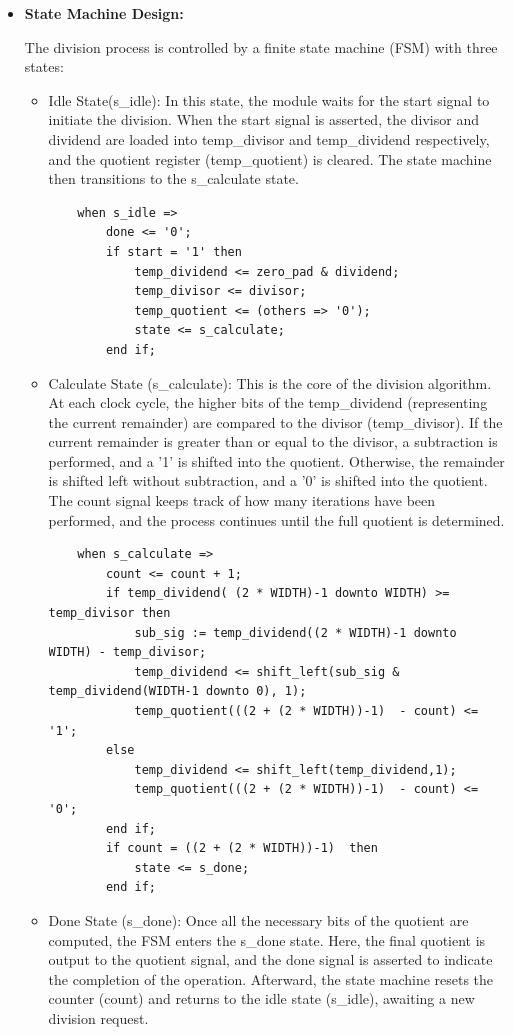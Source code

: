 \begin{itemize}
\item[$\rightarrow$]\textbf{State Machine Design:}

The division process is controlled by a finite state machine (FSM) with three states:

\begin{itemize}
	\item [$\bullet$] Idle State(s\_idle): In this state, the module waits for the start signal to initiate the division. When the start signal is asserted, the divisor and dividend are loaded into temp\_divisor and temp\_dividend respectively, and the quotient register (temp\_quotient) is cleared. The state machine then transitions to the s\_calculate state.
	
	\begin{lstlisting}
	when s_idle => 
		done <= '0';
		if start = '1' then
			temp_dividend <= zero_pad & dividend;
			temp_divisor <= divisor;
			temp_quotient <= (others => '0');
			state <= s_calculate;
		end if;
	\end{lstlisting}

	\item [$\bullet$] Calculate State (s\_calculate): This is the core of the division algorithm. At each clock cycle, the higher bits of the temp\_dividend (representing the current remainder) are compared to the divisor (temp\_divisor). If the current remainder is greater than or equal to the divisor, a subtraction is performed, and a '1' is shifted into the quotient. Otherwise, the remainder is shifted left without subtraction, and a '0' is shifted into the quotient. The count signal keeps track of how many iterations have been performed, and the process continues until the full quotient is determined.
	
	\begin{lstlisting}
	when s_calculate =>
		count <= count + 1;
		if temp_dividend( (2 * WIDTH)-1 downto WIDTH) >= temp_divisor then
			sub_sig := temp_dividend((2 * WIDTH)-1 downto WIDTH) - temp_divisor;
			temp_dividend <= shift_left(sub_sig & temp_dividend(WIDTH-1 downto 0), 1);
			temp_quotient(((2 + (2 * WIDTH))-1)  - count) <= '1';        
		else
			temp_dividend <= shift_left(temp_dividend,1);
			temp_quotient(((2 + (2 * WIDTH))-1)  - count) <= '0';
		end if;
		if count = ((2 + (2 * WIDTH))-1)  then
			state <= s_done;
		end if;
	\end{lstlisting}

	\item [$\bullet$] Done State (s\_done): Once all the necessary bits of the quotient are computed, the FSM enters the s\_done state. Here, the final quotient is output to the quotient signal, and the done signal is asserted to indicate the completion of the operation. Afterward, the state machine resets the counter (count) and returns to the idle state (s\_idle), awaiting a new division request.
	

\end{itemize}
\end{itemize}
